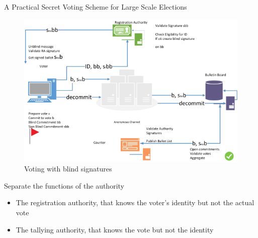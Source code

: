 \documentclass{beamer}
\begin{document}
\begin{frame}[allowframebreaks]{A Practical Secret Voting Scheme for Large Scale Elections \cite{FOO92}}

\begin{figure}[hbtp]
\centering
\includegraphics[scale=3]{foo.png} 
\caption{Voting with blind signatures \cite{FOO92}}
\end{figure}

\framebreak

Separate the functions of the authority
\begin{itemize}
\item The registration authority, that knows the voter's identity but not the actual vote 
\item The tallying authority, that knows the vote but not the identity
\end{itemize}


\end{frame}
\end{document}
